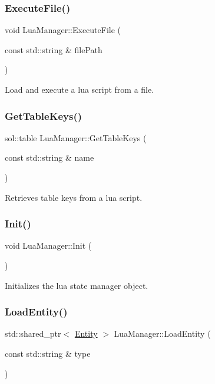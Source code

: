 \subsubsection{\texorpdfstring{Execute\+File()}{ExecuteFile()}}
{\footnotesize\ttfamily void Lua\+Manager\+::\+Execute\+File (\begin{DoxyParamCaption}\item[{const std\+::string \&}]{file\+Path }\end{DoxyParamCaption})}

Load and execute a lua script from a file. \mbox{\label{class_lua_manager_af885a50a5fe0368b32853385342ae7e6}} 
\subsubsection{\texorpdfstring{Get\+Table\+Keys()}{GetTableKeys()}}
{\footnotesize\ttfamily sol\+::table Lua\+Manager\+::\+Get\+Table\+Keys (\begin{DoxyParamCaption}\item[{const std\+::string \&}]{name }\end{DoxyParamCaption})}

Retrieves table keys from a lua script. \mbox{\label{class_lua_manager_a839c0f1bea728a4aa055b8e0be26bc27}} 
\subsubsection{\texorpdfstring{Init()}{Init()}}
{\footnotesize\ttfamily void Lua\+Manager\+::\+Init (\begin{DoxyParamCaption}{ }\end{DoxyParamCaption})}

Initializes the lua state manager object. \mbox{\label{class_lua_manager_a04d24b48c0d51473d64a956fc800c312}} 
\subsubsection{\texorpdfstring{Load\+Entity()}{LoadEntity()}}
{\footnotesize\ttfamily std\+::shared\+\_\+ptr$<$ \mbox{\hyperlink{class_entity}{Entity}} $>$ Lua\+Manager\+::\+Load\+Entity (\begin{DoxyParamCaption}\item[{const std\+::string \&}]{type }\end{DoxyParamCaption})}


